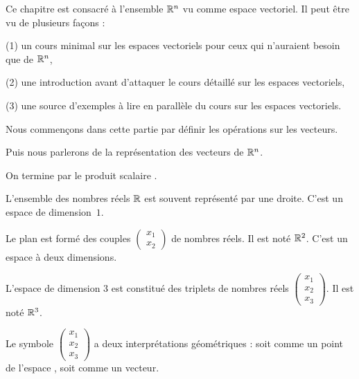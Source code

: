







\debuttexte


\diapo

Ce chapitre est consacré à l'ensemble $\mathbb{R}^n$ vu comme espace vectoriel.
Il peut être vu de plusieurs façons :

(1) un cours minimal sur les espaces vectoriels pour ceux qui n'auraient besoin que
  de $\mathbb{R}^n$,
  
(2) une introduction avant d'attaquer le cours détaillé sur les espaces vectoriels,
  
(3) une source d'exemples à lire en parallèle du cours sur les espaces vectoriels. 


\change

\change


Nous commençons dans cette partie par définir les opérations sur les vecteurs.

\change

Puis nous parlerons de la représentation des vecteurs de $\mathbb{R}^n$.

\change

On termine par le produit scalaire .



\diapo

L'ensemble des nombres réels $\mathbb{R}$ est souvent représenté par une droite. C'est un
espace de dimension~$1$.  
  

Le plan est formé des couples 
$\left(\begin{smallmatrix}x_1\\  x_2\end{smallmatrix}\right)$ de nombres réels. 
Il est noté $\mathbb{R}^2$. C'est un espace à deux dimensions.
  
\change
L'espace de dimension $3$ est constitué des triplets de nombres réels
$\left(\begin{smallmatrix}x_1\\x_2\\x_3\end{smallmatrix}\right)$. 
Il est noté $\mathbb{R}^3$.

\change
Le symbole $\left(\begin{smallmatrix}x_1\\x_2\\x_3\end{smallmatrix}\right)$ 
a deux interprétations géométriques : soit comme un point de l'espace ,
soit comme un vecteur.


